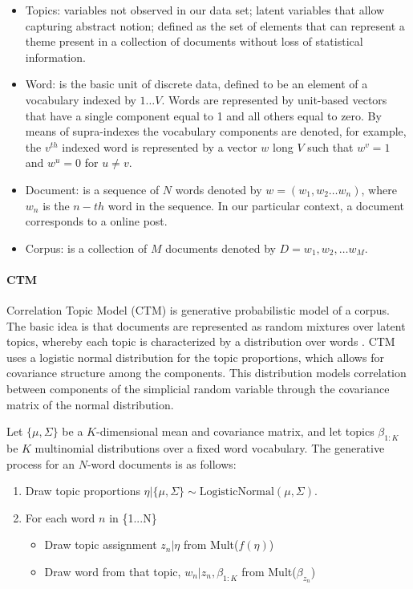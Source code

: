 \documentclass[onecolumn]{article}
\begin{document}
\begin{itemize}
\item Topics: variables not observed in our data set; latent variables that allow capturing abstract notion; defined as the set of elements that can represent a theme present in a collection of documents without loss of statistical information.
\item Word: is the basic unit of discrete data, defined to be an element of a vocabulary indexed by $ {1 \dots V} $. Words are represented by unit-based vectors that have a single component equal to 1 and all others equal to zero. By means of supra-indexes the vocabulary components are denoted, for example, the $ v ^{th}$ indexed word is represented by a vector $ w $ long $ V $ such that $ w^v = 1 $ and $ w^u = 0 $ for $ u \neq v $.
\item Document: is a sequence of $ N $ words denoted by $ w = (w_1, w_2 \dots w_n) $, where $ w_n $ is the $ n-th $ word in the sequence. In our particular context, a document corresponds to a online post.

\item Corpus: is a collection of $ M $ documents denoted by $ D = {w_1, w_2, \dots w_M} $.
\end{itemize}


\paragraph*{CTM}  

Correlation Topic Model (CTM) is generative probabilistic model of a corpus. The basic idea is that documents are represented as random mixtures over latent topics, whereby each topic is characterized by a distribution over words \cite{blei2003}. CTM uses a logistic normal distribution for the topic proportions, which allows for covariance structure among the components. This distribution models correlation between components of the simplicial random variable through the covariance matrix of the normal distribution. 

\vspace{2mm}

Let $\{ \mu, \Sigma \}$ be a $K$-dimensional mean and covariance matrix, and let topics $\beta_{1:K}$ be $K$ multinomial distributions over a fixed word vocabulary. The generative process for an $N$-word documents is as follows:\cite{blei2006ctm}

\begin{enumerate}
    \item Draw topic proportions $\eta | \{ \mu, \Sigma \} \sim  \text{LogisticNormal} (\mu, \Sigma)$.
    \item For each word $n$ in \{1...N\}
    \begin{itemize}
        \item Draw topic assignment $z_n | \eta $ from Mult($f(\eta)$) 
        \item Draw word from that topic, $w_n | z_n,\beta_{1:K} $ from Mult($\beta_{z_n}$)
    \end{itemize}
\end{enumerate}
\end{document}
